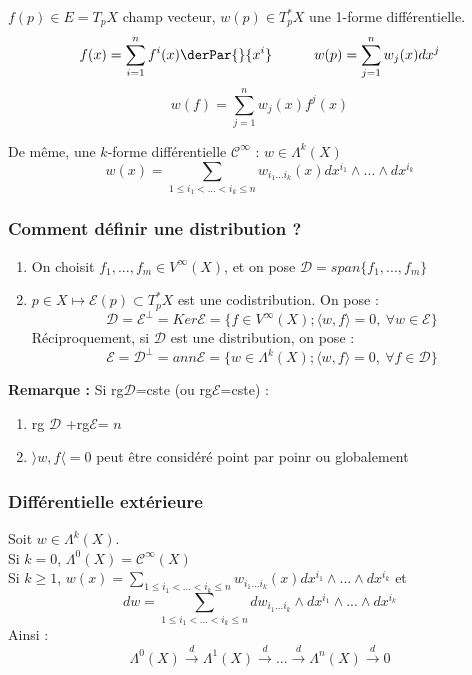 $f(p)\in E=T_pX$ champ vecteur, $w(p)\in T^*_p X$ une 1-forme différentielle.
\[f(x)=\sum_{i=1}^n f^i(x) \derPar{}{x^i} \hspace{3em} w(p)=\sum_{j=1}^n w_j(x) dx^j\]
\[w(f)=\sum_{j=1}^n w_j(x)f^j(x)\]

De même, une $k$-forme différentielle $\mathcal{C}^\infty$ : $w\in\Lambda^k(X)$
\[w(x)=\sum_{1\leq i_1<...<i_k\leq n} w_{i_1...i_k}(x)dx^{i_1}\wedge...\wedge dx^{i_k}\]

\subsubsection{Comment définir une distribution ?}
\begin{enumerate}
	\item On choisit $f_1,...,f_m\in V^\infty(X)$, et on pose $\mathcal{D}=span\{f_1,...,f_m\}$
	\item $p\in X\mapsto \mathscr{E}(p)\subset T_p^* X$ est une codistribution. On pose :
\[\mathcal{D}=\mathscr{E}^\perp = Ker\mathscr{E}=\{f\in V^\infty(X); \langle w,f\rangle =0,\ \forall w\in\mathscr{E}\}\]
Réciproquement, si $\mathcal{D}$ est une distribution, on pose :
\[\mathscr{E}=\mathcal{D}^\perp=ann\mathscr{E}=\{w\in\Lambda^k(X); \langle w,f\rangle =0,\ \forall f\in\mathcal{D}\}\]
\end{enumerate}

\textbf{Remarque :} Si rg$\mathcal{D}$=cste (ou rg$\mathscr{E}$=cste) :
\begin{enumerate}
	\item rg $\mathcal{D}$ +rg$\mathscr{E}$= $n$
	\item $\rangle w,f\langle=0$ peut être considéré point par poinr ou globalement
\end{enumerate}

\subsubsection{Différentielle extérieure}

Soit $w\in\Lambda^k(X)$.\\
Si $k=0$, $\Lambda^0(X)=\mathscr{C}^\infty(X)$ \\
Si $k\geq 1$, $w(x)=\sum_{1\leq i_1<...<i_k\leq n} w_{i_1...i_k}(x)dx^{i_1}\wedge...\wedge dx^{i_k}$ et
\[dw=\sum_{1\leq i_1<...<i_k\leq n} dw_{i_1...i_k}\wedge dx^{i_1}\wedge...\wedge dx^{i_k}\]
Ainsi :
\[\Lambda^0(X)\xrightarrow{d}\Lambda^1(X)\xrightarrow{d}...\xrightarrow{d}\Lambda^n(X)\xrightarrow{d} 0\]

